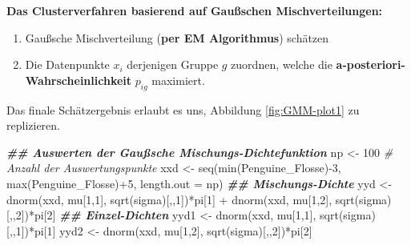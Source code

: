 \documentclass[
  ngerman,
]{book}
\newenvironment{Shaded}{\begin{snugshade}}{\end{snugshade}}
\newcommand{\AttributeTok}[1]{\textcolor[rgb]{0.77,0.63,0.00}{#1}}
\newcommand{\CommentTok}[1]{\textcolor[rgb]{0.56,0.35,0.01}{\textit{#1}}}
\newcommand{\DecValTok}[1]{\textcolor[rgb]{0.00,0.00,0.81}{#1}}
\newcommand{\DocumentationTok}[1]{\textcolor[rgb]{0.56,0.35,0.01}{\textbf{\textit{#1}}}}
\newcommand{\FunctionTok}[1]{\textcolor[rgb]{0.00,0.00,0.00}{#1}}
\newcommand{\NormalTok}[1]{#1}
\newcommand{\OtherTok}[1]{\textcolor[rgb]{0.56,0.35,0.01}{#1}}
\newcommand{\SpecialCharTok}[1]{\textcolor[rgb]{0.00,0.00,0.00}{#1}}
\providecommand{\tightlist}{%
  \setlength{\itemsep}{0pt}\setlength{\parskip}{0pt}}
\begin{document}
\textbf{Das Clusterverfahren basierend auf Gaußschen Mischverteilungen:}

\begin{enumerate}
\def\labelenumi{\arabic{enumi}.}
\tightlist
\item
  Gaußsche Mischverteilung (\textbf{per EM Algorithmus}) schätzen
\item
  Die Datenpunkte \(x_i\) derjenigen Gruppe \(g\) zuordnen, welche die \textbf{a-posteriori-Wahrscheinlichkeit} \(p_{ig}\) maximiert.
\end{enumerate}

Das finale Schätzergebnis erlaubt es uns, Abbildung \ref{fig:GMM-plot1} zu replizieren.

\begin{Shaded}
\begin{Highlighting}[]
\DocumentationTok{\#\# Auswerten der Gaußsche Mischungs{-}Dichtefunktion}
\NormalTok{np      }\OtherTok{\textless{}{-}} \DecValTok{100} \CommentTok{\# Anzahl der Auswertungspunkte}
\NormalTok{xxd     }\OtherTok{\textless{}{-}} \FunctionTok{seq}\NormalTok{(}\FunctionTok{min}\NormalTok{(Penguine\_Flosse)}\SpecialCharTok{{-}}\DecValTok{3}\NormalTok{, }\FunctionTok{max}\NormalTok{(Penguine\_Flosse)}\SpecialCharTok{+}\DecValTok{5}\NormalTok{, }\AttributeTok{length.out =}\NormalTok{ np)}
\DocumentationTok{\#\# Mischungs{-}Dichte}
\NormalTok{yyd     }\OtherTok{\textless{}{-}} \FunctionTok{dnorm}\NormalTok{(xxd, mu[}\DecValTok{1}\NormalTok{,}\DecValTok{1}\NormalTok{], }\FunctionTok{sqrt}\NormalTok{(sigma)[,,}\DecValTok{1}\NormalTok{])}\SpecialCharTok{*}\NormalTok{pi[}\DecValTok{1}\NormalTok{] }\SpecialCharTok{+}
           \FunctionTok{dnorm}\NormalTok{(xxd, mu[}\DecValTok{1}\NormalTok{,}\DecValTok{2}\NormalTok{], }\FunctionTok{sqrt}\NormalTok{(sigma)[,,}\DecValTok{2}\NormalTok{])}\SpecialCharTok{*}\NormalTok{pi[}\DecValTok{2}\NormalTok{]}
\DocumentationTok{\#\# Einzel{-}Dichten}
\NormalTok{yyd1    }\OtherTok{\textless{}{-}} \FunctionTok{dnorm}\NormalTok{(xxd, mu[}\DecValTok{1}\NormalTok{,}\DecValTok{1}\NormalTok{], }\FunctionTok{sqrt}\NormalTok{(sigma)[,,}\DecValTok{1}\NormalTok{])}\SpecialCharTok{*}\NormalTok{pi[}\DecValTok{1}\NormalTok{]}
\NormalTok{yyd2    }\OtherTok{\textless{}{-}} \FunctionTok{dnorm}\NormalTok{(xxd, mu[}\DecValTok{1}\NormalTok{,}\DecValTok{2}\NormalTok{], }\FunctionTok{sqrt}\NormalTok{(sigma)[,,}\DecValTok{2}\NormalTok{])}\SpecialCharTok{*}\NormalTok{pi[}\DecValTok{2}\NormalTok{]}


\end{Highlighting}
\end{Shaded}
\end{document}
